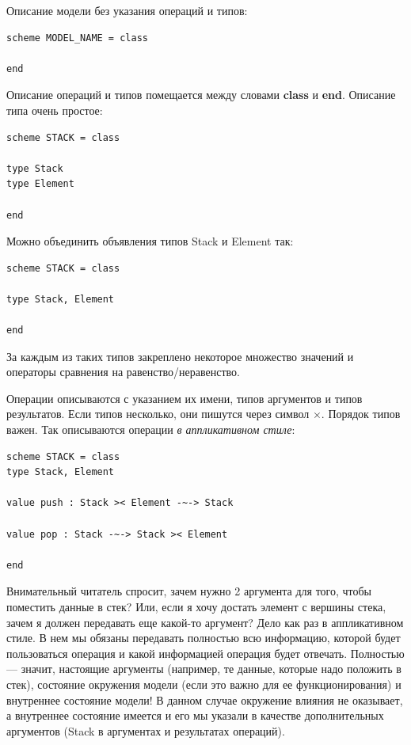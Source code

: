 \documentclass[14pt, twoside]{extreport}
\begin{document}
Описание модели без указания операций и типов:

\begin{lstlisting}
scheme MODEL_NAME = class

end
\end{lstlisting}

Описание операций и типов помещается между словами \textbf{class} и \textbf{end}. Описание типа очень простое:

\begin{lstlisting}
scheme STACK = class

type Stack
type Element

end
\end{lstlisting}

Можно объединить объявления типов Stack и Element так:

\begin{lstlisting}
scheme STACK = class

type Stack, Element

end
\end{lstlisting}

За каждым из таких типов закреплено некоторое множество значений и операторы сравнения на равенство/неравенство.

Операции описываются с указанием их имени, типов аргументов и типов результатов. Если типов несколько, они пишутся через символ $\times$. Порядок типов важен. Так описываются операции \emph{в аппликативном стиле}:

\begin{lstlisting}
scheme STACK = class
type Stack, Element

value push : Stack >< Element -~-> Stack

value pop : Stack -~-> Stack >< Element

end
\end{lstlisting}

Внимательный читатель спросит, зачем нужно 2 аргумента для того, чтобы поместить данные в стек? Или, если я хочу достать элемент с вершины стека, зачем я должен передавать еще какой-то аргумент? Дело как раз в аппликативном стиле. В нем мы обязаны передавать полностью всю информацию, которой будет пользоваться операция и какой информацией операция будет отвечать. Полностью --- значит, настоящие аргументы (например, те данные, которые надо положить в стек), состояние окружения модели (если это важно для ее функционирования) и внутреннее состояние модели! В данном случае окружение влияния не оказывает, а внутреннее состояние имеется и его мы указали в качестве дополнительных аргументов (Stack в аргументах и результатах операций).
\end{document}

